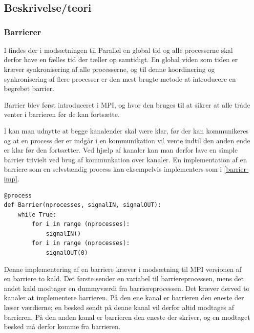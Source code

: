 \chapter{\des}
  \section{Beskrivelse/teori}\label{sec:des-theory}
   
\subsection{Barrierer}\label{barrier}
I \des findes der i modsætningen til 
Parallel \des {} en global tid og alle processerne skal derfor have en 
fælles tid der tæller op samtidigt. 
En global viden som tiden er kræver synkronisering af alle processerne, og  til denne koordinering og synkronisering af flere processer er den mest brugte metode at introducere en begrebet barrier.

Barrier blev først introduceret i MPI, og hvor den bruges til at sikrer at alle tråde venter i barrieren 
før de kan fortsætte. 

I \pycsp kan man udnytte at begge kanalender skal være klar, før der kan 
kommunikeres og at en process der er indgår i en kommunikation vil vente indtil 
den anden ende er klar før den fortsætter. Ved hjælp af kanaler kan man derfor 
lave en simple barrier trivielt ved brug af kommunkation over kanaler. En 
implementation af en barriere som en selvstændig process kan eksempelvis 
implementers som i \cref{barrier-imp}.

\begin{lstlisting}[float, label=barrier-imp,caption=En barriere i \pycsp]
@process
def Barrier(nprocesses, signalIN, signalOUT):
	while True:
		for i in range (nprocesses):
			signalIN()
		for i in range (nprocesses):
			signalOUT(0)
\end{lstlisting}

Denne implementering af en barriere kræver i modsætning til MPI versionen af en 
barriere to kald. Det første sender en variabel til barriereprocessen, mens det 
andet kald modtager en dummyværdi fra barriereprocessen. Det kræver derved to 
kanaler at implementere barrieren. På den ene kanal er barrieren den eneste der 
læser værdierne; en besked sendt på denne kanal vil derfor altid modtages af 
barrieren. På den anden kanal er barrieren den eneste der skriver, og en 
modtaget besked må derfor komme fra barrieren.

